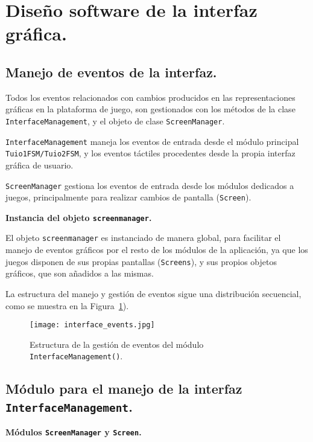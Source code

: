 \section{Diseño software de la interfaz gráfica.}

\subsection{Manejo de eventos de la interfaz.}

Todos los eventos relacionados con cambios producidos en las representaciones gráficas en la plataforma de juego, son gestionados con los métodos de la clase \texttt{InterfaceManagement}, y el objeto de clase \texttt{ScreenManager}.

\texttt{InterfaceManagement} maneja los eventos de entrada desde el módulo principal \texttt{Tuio1FSM/Tuio2FSM}, y los eventos táctiles procedentes desde la propia interfaz gráfica de usuario.

\texttt{ScreenManager} gestiona los eventos de entrada desde los módulos dedicados a juegos, principalmente para realizar cambios de pantalla (\texttt{Screen}).

\textbf{Instancia del objeto \texttt{screenmanager}.}

El objeto \texttt{screenmanager} es instanciado de manera global, para facilitar el manejo de eventos gráficos por el resto de los módulos de la aplicación, ya que los juegos disponen de sus propias pantallas (\texttt{Screens}), y sus propios objetos gráficos, que son añadidos a las mismas.

La estructura del manejo y gestión de eventos sigue una distribución secuencial, como se muestra en la Figura~\ref{fig:interfacevent}).

\begin{figure}[!h]
\begin{center}
\texttt{[image: interface\_events.jpg]}
\caption{Estructura de la gestión de eventos del módulo \texttt{InterfaceManagement()}.}
\label{fig:interfacevent}
\end{center}
\end{figure}


\subsection{Módulo para el manejo de la interfaz \texttt{InterfaceManagement}.}

\textbf{Módulos \texttt{ScreenManager} y \texttt{Screen}.}

